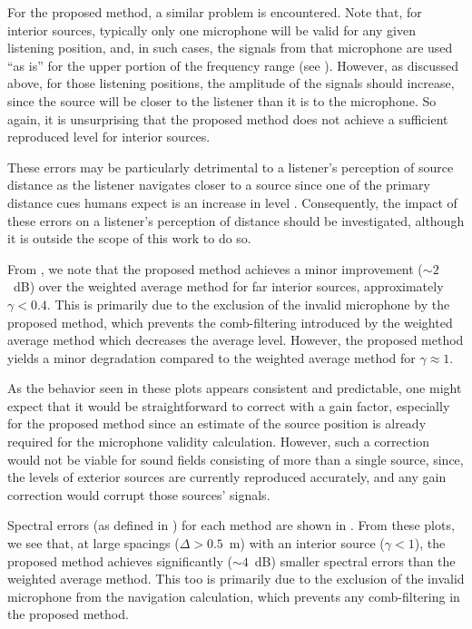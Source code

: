 For the proposed method, a similar problem is encountered.
Note that, for interior sources, typically only one microphone will be valid for any given listening position, and, in such cases, the signals from that microphone are used ``as is'' for the upper portion of the frequency range (see ).
However, as discussed above, for those listening positions, the amplitude of the signals should increase, since the source will be closer to the listener than it is to the microphone. %
So again, it is unsurprising that the proposed method does not achieve a sufficient reproduced level for interior sources.

These errors may be particularly detrimental to a listener's perception of source distance as the listener navigates closer to a source since one of the primary distance cues humans expect is an increase in level \citep[section 3.1.1]{Zahorik2005}.
Consequently, the impact of these errors on a listener's perception of distance should be investigated, although it is outside the scope of this work to do so.

From , we note that the proposed method achieves a minor improvement ($\sim2$~dB) over the weighted average method for far interior sources, approximately $\gamma < 0.4$.
This is primarily due to the exclusion of the invalid microphone by the proposed method, which prevents the comb-filtering introduced by the weighted average method which decreases the average level.
However, the proposed method yields a minor degradation compared to the weighted average method for $\gamma \approx 1$.

As the behavior seen in these plots appears consistent and predictable, one might expect that it would be straightforward to correct with a gain factor, especially for the proposed method since an estimate of the source position is already required for the microphone validity calculation.
However, such a correction would not be viable for sound fields consisting of more than a single source, since, the levels of exterior sources are currently reproduced accurately, and any gain correction would corrupt those sources' signals.


Spectral errors (as defined in ) for each method are shown in .
From these plots, we see that, at large spacings ($\Delta > 0.5$~m) with an interior source ($\gamma < 1$), the proposed method achieves significantly ($\sim 4$~dB) smaller spectral errors than the weighted average method.
This too is primarily due to the exclusion of the invalid microphone from the navigation calculation, which prevents any comb-filtering in the proposed method.

